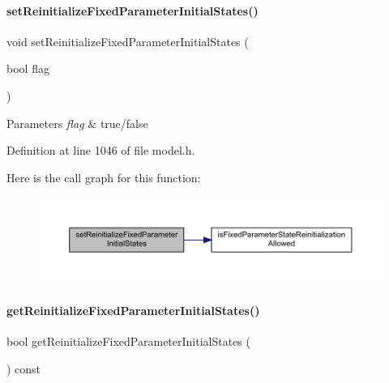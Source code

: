 \paragraph{\texorpdfstring{set\+Reinitialize\+Fixed\+Parameter\+Initial\+States()}{setReinitializeFixedParameterInitialStates()}}
{\footnotesize\ttfamily void set\+Reinitialize\+Fixed\+Parameter\+Initial\+States (\begin{DoxyParamCaption}\item[{bool}]{flag }\end{DoxyParamCaption})}


\begin{DoxyParams}{Parameters}
{\em flag} & true/false \\
\hline
\end{DoxyParams}


Definition at line 1046 of file model.\+h.

Here is the call graph for this function\+:
\nopagebreak
\begin{figure}[H]
\begin{center}
\leavevmode
\includegraphics[width=350pt]{classamici_1_1_model_aaf26e3d4c8b574bc7e63f8beea677bcb_cgraph}
\end{center}
\end{figure}
\mbox{\label{classamici_1_1_model_a09f372616ff7bf8073c732801b666f7e}} 
\paragraph{\texorpdfstring{get\+Reinitialize\+Fixed\+Parameter\+Initial\+States()}{getReinitializeFixedParameterInitialStates()}}
{\footnotesize\ttfamily bool get\+Reinitialize\+Fixed\+Parameter\+Initial\+States (\begin{DoxyParamCaption}{ }\end{DoxyParamCaption}) const}

